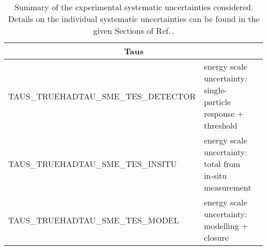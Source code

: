\begin{table}
{\begin{tabular}{l|ll}
\multicolumn{3}{c}{Taus}\\\hline
TAUS\_TRUEHADTAU\_SME\_TES\_DETECTOR & energy scale uncertainty: single-particle response + threshold & \\ %
TAUS\_TRUEHADTAU\_SME\_TES\_INSITU & energy scale uncertainty: total from in-situ measurement & \\
TAUS\_TRUEHADTAU\_SME\_TES\_MODEL & energy scale uncertainty: modelling + closure & \\
\hline\hline
\end{tabular}
}
\caption{Summary of the experimental systematic uncertainties considered. Details on the individual systematic uncertainties can be found in the given Sections of Ref.\,\cite{VHobjectsupportnote}.}
\label{tab:expSyst}
\end{table}
